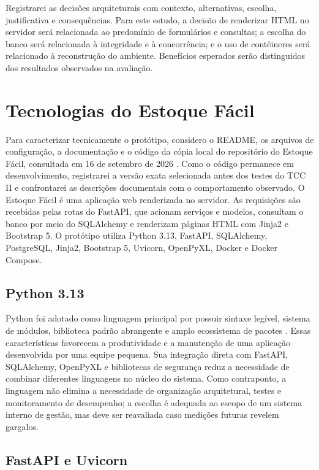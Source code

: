 Registrarei as decisões arquiteturais com contexto, alternativas, escolha, justificativa e consequências. Para este estudo, a decisão de renderizar HTML no servidor será relacionada ao predomínio de formulários e consultas; a escolha do banco será relacionada à integridade e à concorrência; e o uso de contêineres será relacionado à reconstrução do ambiente. Benefícios esperados serão distinguidos dos resultados observados na avaliação.

\section{Tecnologias do Estoque Fácil}

Para caracterizar tecnicamente o protótipo, considero o README, os arquivos de configuração, a documentação e o código da cópia local do repositório do Estoque Fácil, consultada em 16 de setembro de 2026 \cite{EstoqueFacilRepositorio}. Como o código permanece em desenvolvimento, registrarei a versão exata selecionada antes dos testes do TCC II e confrontarei as descrições documentais com o comportamento observado. O Estoque Fácil é uma aplicação web renderizada no servidor. As requisições são recebidas pelas rotas do FastAPI, que acionam serviços e modelos, consultam o banco por meio do SQLAlchemy e renderizam páginas HTML com Jinja2 e Bootstrap 5. O protótipo utiliza Python 3.13, FastAPI, SQLAlchemy, PostgreSQL, Jinja2, Bootstrap 5, Uvicorn, OpenPyXL, Docker e Docker Compose.

\subsection{Python 3.13}

Python foi adotado como linguagem principal por possuir sintaxe legível, sistema de módulos, biblioteca padrão abrangente e amplo ecossistema de pacotes \cite{Python313Docs}. Essas características favorecem a produtividade e a manutenção de uma aplicação desenvolvida por uma equipe pequena. Sua integração direta com FastAPI, SQLAlchemy, OpenPyXL e bibliotecas de segurança reduz a necessidade de combinar diferentes linguagens no núcleo do sistema. Como contraponto, a linguagem não elimina a necessidade de organização arquitetural, testes e monitoramento de desempenho; a escolha é adequada ao escopo de um sistema interno de gestão, mas deve ser reavaliada caso medições futuras revelem gargalos.

\subsection{FastAPI e Uvicorn}

